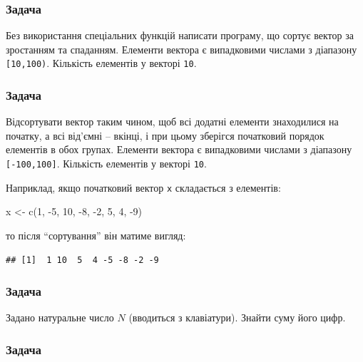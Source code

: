 \documentclass[
]{book}
\newenvironment{Shaded}{\begin{snugshade}}{\end{snugshade}}
\newcommand{\DecValTok}[1]{\textcolor[rgb]{0.00,0.00,0.81}{#1}}
\newcommand{\FunctionTok}[1]{\textcolor[rgb]{0.00,0.00,0.00}{#1}}
\newcommand{\NormalTok}[1]{#1}
\newcommand{\OtherTok}[1]{\textcolor[rgb]{0.56,0.35,0.01}{#1}}
\newcommand{\SpecialCharTok}[1]{\textcolor[rgb]{0.00,0.00,0.00}{#1}}
\begin{document}
\hypertarget{task6113}{%
\subsubsection{Задача}\label{task6113}}

Без використання спеціальних функцій написати програму, що сортує вектор за зростанням та спаданням. Елементи вектора є випадковими числами з діапазону \texttt{{[}10,100)}. Кількість елементів у векторі \texttt{10}.

\hypertarget{task6114}{%
\subsubsection{Задача}\label{task6114}}

Відсортувати вектор таким чином, щоб всі додатні елементи знаходилися на початку, а всі від'ємні -- вкінці, і при цьому зберігся початковий порядок елементів в обох групах. Елементи вектора є випадковими числами з діапазону \texttt{{[}-100,100{]}}. Кількість елементів у векторі \texttt{10}.

Наприклад, якщо початковий вектор \texttt{x} складається з елементів:

\begin{Shaded}
\begin{Highlighting}[]
\NormalTok{x }\OtherTok{\textless{}{-}} \FunctionTok{c}\NormalTok{(}\DecValTok{1}\NormalTok{, }\SpecialCharTok{{-}}\DecValTok{5}\NormalTok{, }\DecValTok{10}\NormalTok{, }\SpecialCharTok{{-}}\DecValTok{8}\NormalTok{, }\SpecialCharTok{{-}}\DecValTok{2}\NormalTok{, }\DecValTok{5}\NormalTok{, }\DecValTok{4}\NormalTok{, }\SpecialCharTok{{-}}\DecValTok{9}\NormalTok{)}
\end{Highlighting}
\end{Shaded}

то після ``сортування'' він матиме вигляд:

\begin{verbatim}
## [1]  1 10  5  4 -5 -8 -2 -9
\end{verbatim}

\hypertarget{task6115}{%
\subsubsection{Задача}\label{task6115}}

Задано натуральне число \(N\) (вводиться з клавіатури). Знайти суму його цифр.

\hypertarget{task6116}{%
\subsubsection{Задача}\label{task6116}}
\end{document}

